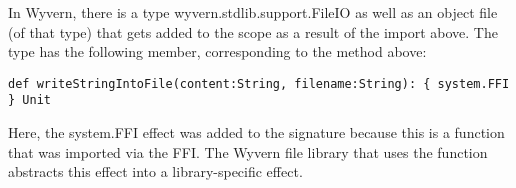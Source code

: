 In Wyvern, there is a type wyvern.stdlib.support.FileIO as well as an object file (of that type) that gets added to the scope as a result of the import above. The type has the following member, corresponding to the method above: \\
\begin{minipage}{\linewidth}
\begin{lstlisting}[xleftmargin=-5pt, numbers=none]
  def writeStringIntoFile(content:String, filename:String): { system.FFI } Unit 
\end{lstlisting}
\end{minipage}

Here, the system.FFI effect was added to the signature because this is a function that was imported via the FFI. The Wyvern file library that uses the  function abstracts this  effect into a library-specific  effect.


